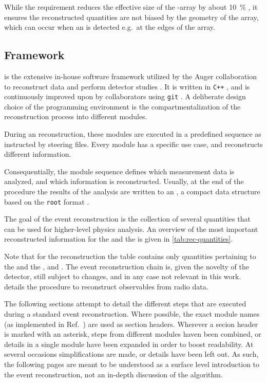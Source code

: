 While the requirement reduces the effective size of the \SD-array by about 
\SI{10}{\percent} \cite{abrahamTriggerApertureSurface2010}, it ensures the 
reconstructed quantities are not biased by the geometry of the array, which can
occur when an \EAS is detected e.g.\ at the edges of the \SD array. 

\subsection{\Offline Framework}

\Offline is the extensive in-house software framework utilized by the Auger 
collaboration to reconstruct \EAS data and perform detector studies
\cite{argiroOfflineSoftwareFramework2007}. It is written in \texttt{C++}
\cite{stroustrupStandard}, and is continuously improved upon by collaborators 
using \texttt{git} \cite{chaconProGit2014, 
thepierreaugercollaborationOfficialOfflineRepository2025,}. A deliberate design
choice of the programming environment is the compartmentalization of the 
reconstruction process into different modules.

During an \EAS reconstruction, these modules are executed in a predefined 
sequence as instructed by \XML steering files. Every module has a specific use 
case, and reconstructs different \EAS information. 

Consequentially, the module sequence defines which measurement data is 
analyzed, and which \EAS information is reconstructed. Usually, at the end of 
the procedure the results of the analysis are written to an \ADST, a compact 
data structure based on the \texttt{root} format 
\cite{brunROOTObjectOriented1997}. 

The goal of the event reconstruction is the collection of several quantities 
that can be used for higher-level physics analysis. An overview of the most 
important reconstructed information for the \FD and the \SD is given in 
\cref{tab:rec-quantities}. 

Note that for the \SD reconstruction the table contains only quantities 
pertaining to the \WCD and the \SSD, and \UMD. The \RD event reconstruction 
chain is, given the novelty of the detector, still subject to changes, and in 
any case not relevant in this work.  details the procedure to reconstruct \EAS observables from radio data. 

The following sections attempt to detail the different steps that are executed 
during a standard event reconstruction. Where possible, the exact module names 
(as implemented in Ref.\ 
\cite{thepierreaugercollaborationOfficialOfflineRepository2025}) are used as 
section headers. Wherever a secion header is marked with an asterisk, steps
from different modules haven been combined, or details in a single module have
been expanded in order to boost readability. At several occasions 
simplifications are made, or details have been left out. As such, the following
pages are meant to be understood as a surface level introduction to the 
\Offline event reconstruction, not an in-depth discussion of the algorithm.

